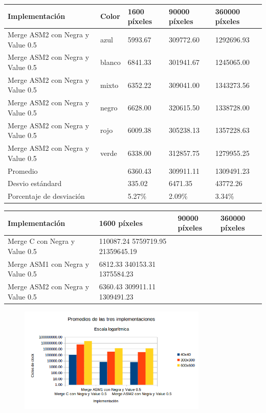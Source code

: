 \begin{tabular}{| l | l | l | l | l |}
\hline
Implementación & Color & 1600 píxeles & 90000 píxeles & 360000 píxeles\\
\hline
Merge ASM2 con Negra y Value 0.5 & azul & 5993.67	& 309772.60 & 	1292696.93\\ 
\hline
Merge ASM2 con Negra y Value 0.5 & blanco & 6841.33	& 301941.67 &	1245065.00\\ 
\hline
Merge ASM2 con Negra y Value 0.5 & mixto & 6352.22	& 309041.00	& 1343273.56\\ 
\hline
Merge ASM2 con Negra y Value 0.5 & negro & 6628.00	& 320615.50	& 1338728.00\\
\hline
Merge ASM2 con Negra y Value 0.5 & rojo & 6009.38	& 305238.13	& 1357228.63\\
\hline
Merge ASM2 con Negra y Value 0.5 & verde & 6338.00	& 312857.75	& 1279955.25\\ 
\hline
Promedio & &  6360.43	& 309911.11	& 1309491.23\\
\hline
Desvio estándard  && 335.02	& 6471.35	& 43772.26\\
\hline
Porcentaje de desviación  && 5.27\% &	2.09\% &	3.34\%\\
\hline
\end{tabular}

\begin{tabular}{| l | l | l | l|}
\hline
Implementación  & 1600 píxeles & 90000 píxeles & 360000 píxeles\\
\hline
Merge C con Negra y Value 0.5  & 110087.24	5759719.95	21359645.19\\
\hline
Merge ASM1 con Negra y Value 0.5  & 6812.33	340153.31	1375584.23\\
\hline
Merge ASM2 con Negra y Value 0.5 & 6360.43	309911.11	1309491.23\\
\hline
\end{tabular}

\begin{figure}[ht]
\centering
\includegraphics[width=90mm]{merge/grafico_merge_conNegras.png}
\end{figure}
